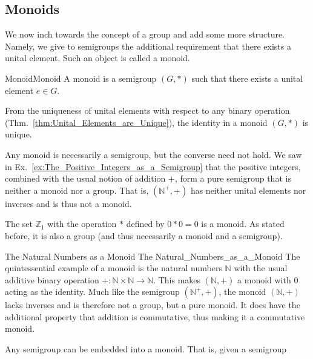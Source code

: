     \subsection{Monoids}
        We now inch towards the concept of a group and add some more structure.
        Namely, we give to semigroups the additional requirement that there
        exists a unital element. Such an object is called a monoid.
        \begin{fdefinition}{Monoid}{Monoid}
            A \gls{monoid} is a \gls{semigroup} $(G,*)$ such that there exists a
            \gls{unital element} $e\in{G}$.
        \end{fdefinition}
        From the uniqueness of unital elements with respect to any binary
        operation (Thm.~\ref{thm:Unital_Elements_are_Unique}), the identity in a
        monoid $(G,*)$ is unique.
        \begin{example}
            Any monoid is necessarily a semigroup, but the converse need not
            hold. We saw in Ex.~\ref{ex:The_Positive_Integers_as_a_Semigroup}
            that the positive integers, combined with the usual notion of
            addition $+$, form a pure semigroup that is neither a monoid nor a
            group. That is, $(\mathbb{N}^{+},+)$ has neither unital elements nor
            inverses and is thus not a monoid.
        \end{example}
        \begin{example}
            The set $\mathbb{Z}_{1}$ with the operation $*$ defined by $0*0=0$
            is a monoid. As stated before, it is also a group (and thus
            necessarily a monoid and a semigroup).
        \end{example}
        \begin{fexample}{The Natural Numbers as a Monoid}
                        {The Natural_Numbers_as_a_Monoid}
            The quintessential example of a monoid is the natural numbers
            $\mathbb{N}$ with the usual additive binary operation
            $+:\mathbb{N}\times\mathbb{N}\rightarrow\mathbb{N}$. This makes
            $(\mathbb{N},+)$ a monoid with 0 acting as the identity. Much like
            the semigroup $(\mathbb{N}^{+},+)$, the monoid $(\mathbb{N},+)$
            lacks inverses and is therefore not a group, but a pure monoid. It
            does have the additional property that addition is commutative, thus
            making it a \gls{commutative monoid}.
        \end{fexample}
        Any semigroup can be embedded into a monoid. That is, given a semigroup
